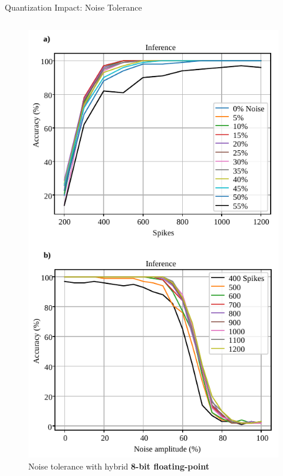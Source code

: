 \begin{frame}{Quantization Impact: Noise Tolerance}
\begin{columns}
		\begin{column}{0.33\textwidth}
			\centering
			\begin{figure}
				\includegraphics[width=0.75\linewidth]{../chapters/sbs_accelerator/figures/accuracy_vs_noise_pu_cfp(4-bit-exponent_1-bit-mantissa).pdf} %
				\caption{ Noise tolerance with hybrid \textbf{8-bit floating-point}}
			\end{figure}
			\pause
		\end{column}
		

\end{columns}
\end{frame}
